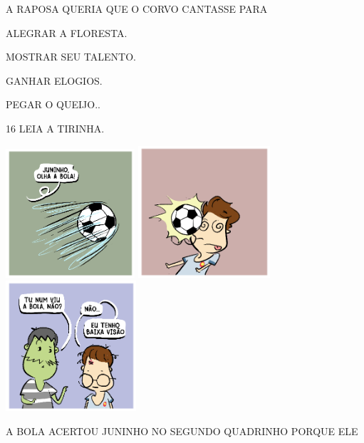 A RAPOSA QUERIA QUE O CORVO CANTASSE PARA

\begin{escolha}
\item ALEGRAR A FLORESTA.

\item MOSTRAR SEU TALENTO.

\item GANHAR ELOGIOS.

\item PEGAR O QUEIJO..
\end{escolha}

\num{16} LEIA A TIRINHA.

\includegraphics[width=1.88542in,height=1.88542in]{media/image236.png}
\includegraphics[width=1.92708in,height=1.92708in]{media/image237.png}
\includegraphics[width=1.90625in,height=1.90625in]{media/image238.png}


A BOLA ACERTOU JUNINHO NO SEGUNDO QUADRINHO PORQUE ELE


